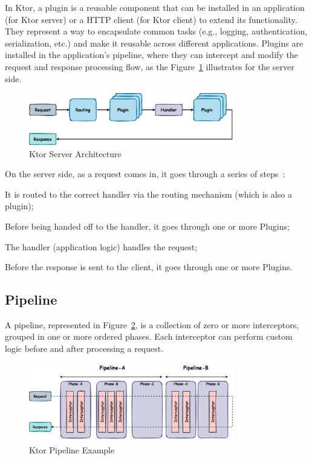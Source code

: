 In Ktor,
a plugin is a reusable component that can be installed in an application
(for Ktor server) or a HTTP client (for Ktor client) to extend its functionality.
They represent a way to encapsulate common tasks (e.g., logging, authentication, serialization, etc.) and make it reusable across different applications.
Plugins are installed in the application's pipeline,
where they can intercept and modify the request and response processing flow,
as the Figure~\ref{fig:ktor-server-architecture} illustrates for the server side.

\begin{figure}[!htb]
    \centering
    \includegraphics[width=0.8\textwidth]{../figures/03_ktor-server-architecture}
    \caption{Ktor Server Architecture}
    \label{fig:ktor-server-architecture}
\end{figure}

On the server side, as a request comes in, it goes through a series of steps~\cite{ktor-server-plugins}:

\begin{boldenumerate}
    \item It is routed to the correct handler via the routing mechanism (which is also a plugin);
    \item Before being handed off to the handler, it goes through one or more Plugins;
    \item The handler (application logic) handles the request;
    \item Before the response is sent to the client, it goes through one or more Plugins.
\end{boldenumerate}

\subsection{Pipeline}\label{subsec:pipeline}

A pipeline, represented in Figure~\ref{fig:ktor-pipeline}, is a collection of zero or more interceptors, grouped in one or more ordered phases.
Each interceptor can perform custom logic before and after processing a request.

\begin{figure}[!htb]
    \centering
    \includegraphics[width=0.8\textwidth]{../figures/03_ktor-pipeline}
    \caption{Ktor Pipeline Example}
    \label{fig:ktor-pipeline}
\end{figure}

